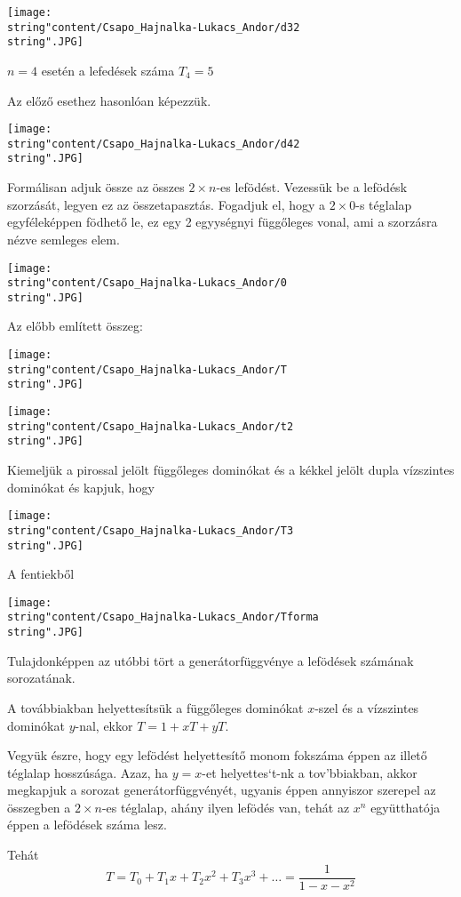 \begin{solution}
\begin{enumerate}
\texttt{[image: \\string"content/Csapo\_Hajnalka-Lukacs\_Andor/d32\\string".JPG]}

$n=4$ esetén a lefedések száma $T_{4}=5$

Az előző esethez hasonlóan képezzük.

\texttt{[image: \\string"content/Csapo\_Hajnalka-Lukacs\_Andor/d42\\string".JPG]}

Formálisan adjuk össze az összes $2\times n$-es lefödést. Vezessük
be a lefödésk szorzását, legyen ez az összetapasztás. Fogadjuk el,
hogy a $2\times0$-s téglalap egyféleképpen födhető le, ez egy 2 egyységnyi
függőleges vonal, ami a szorzásra nézve semleges elem.

\begin{center}
	\texttt{[image: \\string"content/Csapo\_Hajnalka-Lukacs\_Andor/0\\string".JPG]}
\end{center}


Az előbb említett összeg:

\texttt{[image: \\string"content/Csapo\_Hajnalka-Lukacs\_Andor/T\\string".JPG]}

\texttt{[image: \\string"content/Csapo\_Hajnalka-Lukacs\_Andor/t2\\string".JPG]}

Kiemeljük a pirossal jelölt függőleges dominókat és a kékkel jelölt
dupla vízszintes dominókat és kapjuk, hogy

\texttt{[image: \\string"content/Csapo\_Hajnalka-Lukacs\_Andor/T3\\string".JPG]}

A fentiekből
\begin{center}
	\texttt{[image: \\string"content/Csapo\_Hajnalka-Lukacs\_Andor/Tforma\\string".JPG]}
\end{center}
Tulajdonképpen az utóbbi tört a generátorfüggvénye a lefödések számának
sorozatának.

A továbbiakban helyettesítsük a függőleges dominókat $x$-szel és
a vízszintes dominókat $y$-nal, ekkor $T=1+xT+yT$.

Vegyük észre, hogy egy lefödést helyettesítő monom fokszáma éppen
az illető téglalap hosszúsága. Azaz, ha $y=x$-et helyettes`t-nk a
tov'bbiakban, akkor megkapjuk a sorozat generátorfüggvényét, ugyanis
éppen annyiszor szerepel az összegben a $2\times n$-es téglalap,
ahány ilyen lefödés van, tehát az $x^{n}$ együtthatója éppen a lefödések
száma lesz.

Tehát 
\[
T=T_{0}+T_{1}x+T_{2}x^{2}+T_{3}x^{3}+\dots=\dfrac{1}{1-x-x^{2}}
\]


\end{enumerate}
\end{solution}
